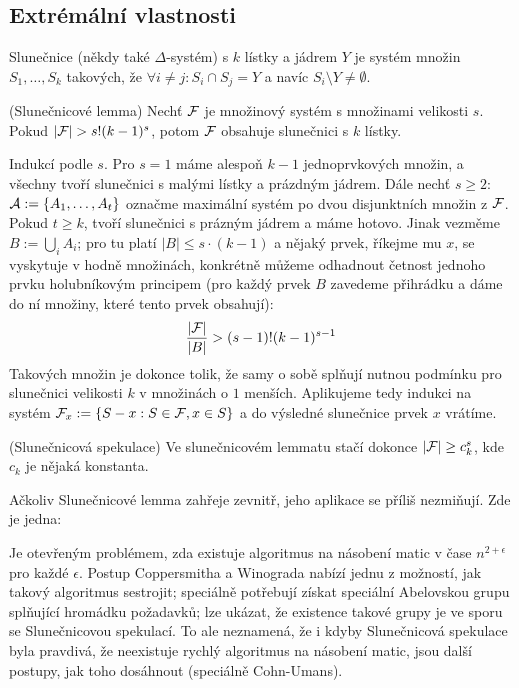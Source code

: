 \subsection{Extrémální vlastnosti}

\df Slunečnice (někdy také $\Delta$-systém) s $k$ lístky a jádrem $Y$ je systém
množin $S_1, \dots, S_k$ takových, že $\forall i\neq j: S_i \cap S_j = Y$ a
navíc $S_i \setminus Y \neq \emptyset$.

\vt (Slunečnicové lemma) Nechť $\mathcal{F}$ je množinový systém s množinami velikosti
$s$.  Pokud $|\mathcal{F}| > s!  (k-1)^s$, potom $\mathcal{F}$ obsahuje slunečnici s $k$ lístky.

\dk Indukcí podle $s$. Pro $s=1$ máme alespoň $k-1$ jednoprvkových množin, a
všechny tvoří slunečnici s malými lístky a prázdným jádrem. Dále nechť $s\geq
2$: $\mathcal{A} := \{A_1, \dots, A_t\}$ označme maximální systém po dvou disjunktních
množin z $\mathcal{F}$. Pokud $t \geq k$, tvoří slunečnici s prázným jádrem a máme
hotovo. Jinak vezměme $B := \bigcup_i A_i$; pro tu platí $|B| \leq s\cdot (k-1)$
a nějaký prvek, říkejme mu $x$, se vyskytuje v hodně množinách, konkrétně můžeme
odhadnout četnost jednoho prvku holubníkovým principem (pro každý prvek $B$
zavedeme přihrádku a dáme do ní množiny, které tento prvek obsahují):
\begin{align*}
	{|\mathcal{F}| \over |B|} > (s-1)!(k-1)^{s-1}
\end{align*}
Takových množin je dokonce tolik, že samy o sobě splňují nutnou podmínku pro
slunečnici velikosti $k$ v množinách o $1$ menších. Aplikujeme tedy indukci na
systém $\mathcal{F}_x := \{S - x: S \in \mathcal{F}, x \in S\}$ a do výsledné slunečnice prvek
$x$ vrátíme.

\vt (Slunečnicová spekulace) Ve slunečnicovém lemmatu stačí dokonce $|\mathcal{F}| \geq
c_k^s$, kde $c_k$ je nějaká konstanta.

\pzn Ačkoliv Slunečnicové lemma zahřeje zevnitř, jeho aplikace se příliš
nezmiňují. Zde je jedna:

Je otevřeným problémem, zda existuje algoritmus na násobení matic v čase
$n^{2+\epsilon}$ pro každé $\epsilon$. Postup Coppersmitha a Winograda nabízí
jednu z možností, jak takový algoritmus sestrojit; speciálně potřebují získat
speciální Abelovskou grupu splňující hromádku požadavků; lze ukázat, že
existence takové grupy je ve sporu se Slunečnicovou spekulací. To ale
neznamená, že i kdyby Slunečnicová spekulace byla pravdivá, že neexistuje
rychlý algoritmus na násobení matic, jsou další postupy, jak toho dosáhnout
(speciálně Cohn-Umans).


